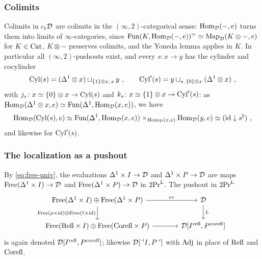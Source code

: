\subsubsection*{Colimits}
%
Colimits in $\iota_{1}\mathcal{D}$ are colimits in the $(\infty,2)$-categorical sense:
$\operatorname{Hom}_{\mathcal{D}}(-,e)$ turns them into limits of $\infty$-categories, since
$\operatorname{Fun}(K,\operatorname{Hom}_{\mathcal{D}}(-,e))^{\simeq} \simeq \operatorname{Map}_{\mathcal{D}}(K \otimes -,e)$
for $K \in \mathrm{Cat}$, $K \otimes -$ preserves colimits,
and the Yoneda lemma applies in $K$. In particular all $(\infty,2)$-pushouts
exist, and every $s\colon x \to y$ has the cylinder and cocylinder
\begin{equation*}
\mathrm{Cyl}(s) = (\Delta^{1} \otimes x) \sqcup_{\{1\} \otimes x,\,s} y \ ,
\qquad \mathrm{Cyl}'(s) = y \sqcup_{s,\,\{0\} \otimes x} (\Delta^{1} \otimes x) \ ,
\end{equation*}
with
$j_{s}\colon x \simeq \{0\} \otimes x \to \mathrm{Cyl}(s)$
and
$k_{s}\colon x \simeq \{1\} \otimes x \to \mathrm{Cyl}'(s)$:
as
$\operatorname{Hom}_{\mathcal{D}}(\Delta^{1} \otimes x,e) \simeq \operatorname{Fun}(\Delta^{1},\operatorname{Hom}_{\mathcal{D}}(x,e))$,
we have
\begin{equation*}
\operatorname{Hom}_{\mathcal{D}}(\mathrm{Cyl}(s),e) \simeq \operatorname{Fun}(\Delta^{1},\operatorname{Hom}_{\mathcal{D}}(x,e))
\times_{\operatorname{Hom}_{\mathcal{D}}(x,e)} \operatorname{Hom}_{\mathcal{D}}(y,e) \simeq (\mathrm{id} \downarrow
s^{\natural}) \ ,
\end{equation*}
and likewise for $\mathrm{Cyl}'(s)$.

\subsubsection*{The localization as a pushout}

\begin{defi}
\label{def:adjoin-pres}
%
By \eqref{eq:free-univ}, the evaluations
$\Delta^{1} \times I \to \mathcal{D}$
and
$\Delta^{1} \times P \to \mathcal{D}$
are maps
$\operatorname{Free}(\Delta^{1} \times I) \to \mathcal{D}$
and
$\operatorname{Free}(\Delta^{1} \times P) \to \mathcal{D}$
in $\operatorname{2Pr}^{\operatorname{L}}$. The pushout in $\operatorname{2Pr}^{\operatorname{L}}$
\begin{equation*}
\begin{tikzcd}[column sep=large]
\Free(\Delta^{1} \times I) \oplus \Free(\Delta^{1} \times P) \ar[r,
"\mathrm{ev}"] \ar[d, "\Free(\rho \times \mathrm{id}) \oplus \Free(\ell \times
\mathrm{id})"'] & \D \ar[d, "L"] \\
\Free(\Refl \times I) \oplus \Free(\Corefl \times P) \ar[r] & \D\lrrefl{I}{P}
\end{tikzcd}
\end{equation*}
is again denoted $\mathcal{D}[{I}^{\mathrm{refl}},{P}^{\mathrm{corefl}}]$; likewise $\mathcal{D}[{}^{\dashv}{I},{P}^{\dashv}]$ with $\mathrm{Adj}$ in
place of $\mathrm{Refl}$ and $\mathrm{Corefl}$.
\end{defi}

